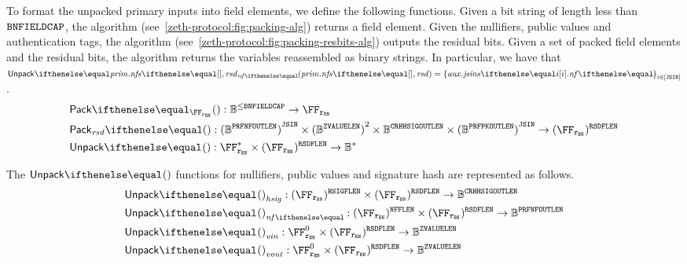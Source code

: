 To format the unpacked primary inputs into field elements, we define the following functions.
Given a bit string of length less than $\mathtt{BNFIELDCAP}$, the algorithm \pack{}{} (see~\cref{zeth-protocol:fig:packing-alg}) returns a field element. Given the nullifiers, public values and authentication tags, the algorithm \packResBits{}{} (see~\cref{zeth-protocol:fig:packing-resbits-alg}) outputs the residual bits. Given a set of packed field elements and the residual bits, the algorithm \unpack{}{} returns the variables reassembled as binary strings. In particular, we have that $\unpack{\priminputs.\nfs{}, \resbits}{\nf{}} = \indexedset{\auxinputs.\jsins{i}.\nf{}}{i \in [\jsin]}$.
\begin{align*}
    &\pack{}{\FFx{\rBN}} : \BB^{\leq \bnFieldBitCap} \to \FFx{\rBN} \\
    &\packResBits{} : {(\BB^\prfNfOutLen)}^{\jsin} \times {(\BB^\zvalueLen)}^2 \times \BB^\crhhsigOutLen \times {(\BB^\prfPkOutLen)}^{\jsin} \to (\FFx{\rBN})^\resBitsFLen \\
    &\unpack{}{} : \FFx{\rBN}^* \times (\FFx{\rBN})^{\resBitsFLen} \to \BB^* \\
\end{align*}

The $\unpack{}{}$ functions for nullifiers, public values and signature hash are represented as follows.
\begin{align*}
    &\unpack{}{}_{\hsig} : (\FFx{\rBN})^\hsigFLen \times (\FFx{\rBN})^{\resBitsFLen} \to \BB^\crhhsigOutLen \\
    &\unpack{}{}_{\nf{}} : (\FFx{\rBN})^\nfFLen \times (\FFx{\rBN})^{\resBitsFLen} \to \BB^\prfNfOutLen \\
    &\unpack{}{}_{\vin} : \FFx{\rBN}^0 \times (\FFx{\rBN})^{\resBitsFLen} \to \BB^\zvalueLen \\
    &\unpack{}{}_{\vout} : \FFx{\rBN}^0 \times (\FFx{\rBN})^{\resBitsFLen} \to \BB^\zvalueLen
\end{align*}

